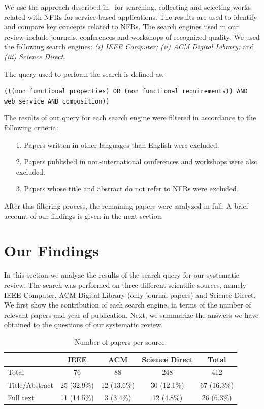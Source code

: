 \documentclass[english,12pt]{article}
\begin{document}
We use the approach described in~\cite{Kitchenham08} for searching,
collecting and selecting works related with NFRs for service-based applications. 
The results are used to identify and compare key concepts related to NFRs.
The search engines used in our review include journals, conferences and
workshops of recognized quality. 
We used the following search engines: \textit{(i) IEEE Computer; (ii) ACM Digital Library;} and
\textit{(iii) Science Direct}.

The query used to perform the search is defined as: 
 \begin{center}
\texttt{(((non functional properties) OR (non functional requirements))
AND web service AND composition))}
\end{center}

The results of our query for each search engine were filtered in accordance to the following criteria:
\begin{enumerate}
\item[1.] Papers written in other languages than English were excluded.
\item[2.] Papers published in non-international conferences and workshops were also excluded.
\item[3.] Papers whose title and abstract do not refer to NFRs were excluded. 
\end{enumerate}

After this filtering process, the remaining papers were analyzed in full.
A brief account of our findings is given in the next section.

\section{Our Findings}   
\label{sec:nfindings}   




In this section we analyze the results of the search query for our systematic review.
The search was performed on three different scientific sources, namely IEEE Computer, ACM Digital Library (only journal papers) and Science Direct.
We first show the contribution of each search engine, in terms of the number of relevant papers and year of publication.
Next, we summarize the answers we have obtained to the questions of our systematic review.


\begin{table}[ht!]
\small
\centering
\begin{tabular}{l|c|c|c|c}
  \hline
  \hline
   & IEEE & ACM  & Science Direct & Total \\
  \hline
  \hline
  Total  & 76 &  88  & 248 & 412 \\
  \hline
  Title/Abstract & 25 (32.9\%) & 12 (13.6\%) & 30 (12.1\%)  & 67 (16.3\%) \\
  \hline
  Full text & 11 (14.5\%) & 3 (3.4\%) & 12 (4.8\%) & 26 (6.3\%)\\
  \hline
  \hline
\end{tabular}
\caption{Number of papers per source.}
\label{tab:result01}
\end{table}
 
\end{document}
